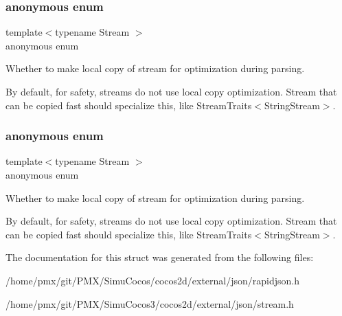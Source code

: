 \subsubsection{\texorpdfstring{anonymous enum}{anonymous enum}}
{\footnotesize\ttfamily template$<$typename Stream $>$ \\
anonymous enum}



Whether to make local copy of stream for optimization during parsing. 

By default, for safety, streams do not use local copy optimization. Stream that can be copied fast should specialize this, like Stream\+Traits$<$\+String\+Stream$>$. \mbox{\label{structStreamTraits_af668eccd9301834cee57f31485d74ac5}} 
\subsubsection{\texorpdfstring{anonymous enum}{anonymous enum}}
{\footnotesize\ttfamily template$<$typename Stream $>$ \\
anonymous enum}



Whether to make local copy of stream for optimization during parsing. 

By default, for safety, streams do not use local copy optimization. Stream that can be copied fast should specialize this, like Stream\+Traits$<$\+String\+Stream$>$. 

The documentation for this struct was generated from the following files\+:\begin{DoxyCompactItemize}
\item 
/home/pmx/git/\+P\+M\+X/\+Simu\+Cocos/cocos2d/external/json/rapidjson.\+h\item 
/home/pmx/git/\+P\+M\+X/\+Simu\+Cocos3/cocos2d/external/json/stream.\+h\end{DoxyCompactItemize}

